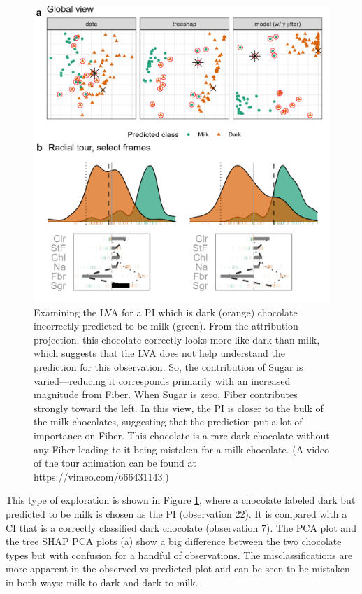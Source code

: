 \documentclass[
]{jss}
\begin{document}
\begin{CodeChunk}
\begin{figure}

{\centering \includegraphics[width=1\linewidth]{./figures/case_chocolates} 

}

\caption[Examining the LVA for a PI which is dark (orange) chocolate incorrectly predicted to be milk (green)]{Examining the LVA for a PI which is dark (orange) chocolate incorrectly predicted to be milk (green). From the attribution projection, this chocolate correctly looks more like dark than milk, which suggests that the LVA does not help understand the prediction for this observation. So, the contribution of Sugar is varied---reducing it corresponds primarily with an increased magnitude from Fiber. When Sugar is zero, Fiber contributes strongly toward the left. In this view, the PI is closer to the bulk of the milk chocolates, suggesting that the prediction put a lot of importance on Fiber. This chocolate is a rare dark chocolate without any Fiber leading to it being mistaken for a milk chocolate. (A video of the tour animation can be found at https://vimeo.com/666431143.)}\label{fig:casechocolates}
\end{figure}
\end{CodeChunk}

This type of exploration is shown in Figure \ref{fig:casechocolates},
where a chocolate labeled dark but predicted to be milk is chosen as the
PI (observation 22). It is compared with a CI that is a correctly
classified dark chocolate (observation 7). The PCA plot and the tree
SHAP PCA plots (a) show a big difference between the two chocolate types
but with confusion for a handful of observations. The misclassifications
are more apparent in the observed vs predicted plot and can be seen to
be mistaken in both ways: milk to dark and dark to milk.
\end{document}
